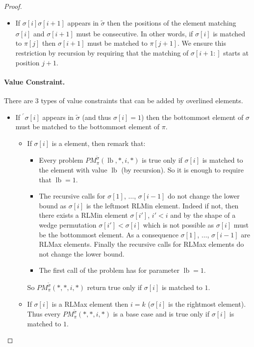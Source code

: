 \documentclass[a4paper]{llncs}
\newcommand{\RLMin}{\text{RLMin}\xspace}
\newcommand{\ptext}{\pi}
\newcommand{\ppattern}{\sigma}
\newcommand{\PM}{PM}
\DeclareMathOperator{\lb}{lb}
\begin{document}
\begin{proof}
\begin{itemize}
	\item If $\underline{\ppattern[i]\ppattern[i+1]}$ appears in $\widetilde{\sigma}$ then the positions of the element matching $\ppattern[i]$ and $\ppattern[i+1]$ must be consecutive. In other words, if $\ppattern[i]$ is matched to $\ptext[j]$ then $\ppattern[i+1]$ must be matched to $\ptext[j+1]$. We ensure this restriction by recursion by requiring that the matching of $\ppattern[i+1:]$ starts at position $j+1$.
\end{itemize}

\paragraph{Value Constraint.} There are 3 types of value constraints that can be added by overlined elements.
\begin{itemize}
	\item If $^\ulcorner{\sigma[i]}$ appears in $\widetilde{\sigma}$ (and thus $\sigma[i]=1$) then the bottommost element of $\ppattern$ must be matched to the bottommost element of $\ptext$.
	\begin{itemize}

		\item If $\sigma[i]$ is a \RLMin element, then remark that:
		\begin{itemize}
			\item Every problem
			$\PM^{\widetilde{\sigma}}_{\ptext}(\lb,*,i,*)$ is true only if $\sigma[i]$ is matched to the element with value $\lb$ (by recursion).
			So it is enough to require that $\lb=1$.
			\item The recursive calls for $\sigma[1]$, $\ldots$, $\sigma[i-1]$
			do not change the lower bound as
			$\sigma[i]$ is the leftmost RLMin element. Indeed if not, then there exists a RLMin element $\sigma[i']$, $i'<i$ and by the shape of a wedge permutation $\sigma[i']<\sigma[i]$ which is not possible as $\sigma[i]$ must be the bottommost element.
			As a consequence $\sigma[1]$, $\ldots$, $\sigma[i-1]$ are RLMax elements. Finally the recursive calls for RLMax elements do not change the lower bound.
			\item The first call of the problem has for parameter $\lb=1$.
		\end{itemize}
		So $\PM^{\widetilde{\sigma}}_{\ptext}(*,*,i,*)$ return true only if
		$\sigma[i]$ is matched to $1$.

		\item If $\sigma[i]$ is a RLMax element then $i=k$ ($\sigma[i]$ is the rightmost element). Thus every $\PM^{\widetilde{\sigma}}_{\ptext}(*,*,i,*)$ is a base case and is true only if $\sigma[i]$ is matched to $1$.


\end{itemize}
\end{itemize}
\end{proof}
\end{document}
